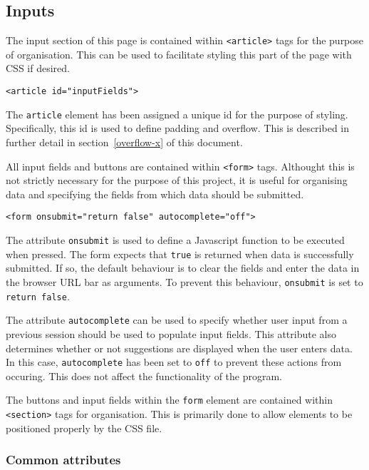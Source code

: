 \documentclass[letterpaper]{article}
\begin{document}
\subsection{Inputs}

The input section of this page is contained within \lstinline{<article>} tags for the purpose of organisation.
This can be used to facilitate styling this part of the page with CSS if desired.

\begin{lstlisting}[firstnumber=10]
<article id="inputFields">
\end{lstlisting}

The \lstinline{article} element has been assigned a unique id for the purpose of styling.
Specifically, this id is used to define padding and overflow.
This is described in further detail in section~\ref{overflow-x} of this document.

All input fields and buttons are contained within \lstinline{<form>} tags.
Althought this is not strictly necessary for the purpose of this project, it is useful for organising data and specifying the fields from which data should be submitted.

\begin{lstlisting}[firstnumber=11]
<form onsubmit="return false" autocomplete="off">
\end{lstlisting}

The attribute \lstinline{onsubmit} is used to define a Javascript function to be executed when pressed.
The form expects that \lstinline{true} is returned when data is successfully submitted.
If so, the default behaviour is to clear the fields and enter the data in the browser URL bar as arguments.
To prevent this behaviour, \lstinline{onsubmit} is set to \lstinline{return false}.

The attribute \lstinline{autocomplete} can be used to specify whether user input from a previous session should be used to populate input fields.
This attribute also determines whether or not suggestions are displayed when the user enters data.
In this case, \lstinline{autocomplete} has been set to \lstinline{off} to prevent these actions from occuring.
This does not affect the functionality of the program.

The buttons and input fields within the \lstinline{form} element are contained within \lstinline{<section>} tags for organisation.
This is primarily done to allow elements to be positioned properly by the CSS file.

\subsubsection{Common attributes}
\end{document}
